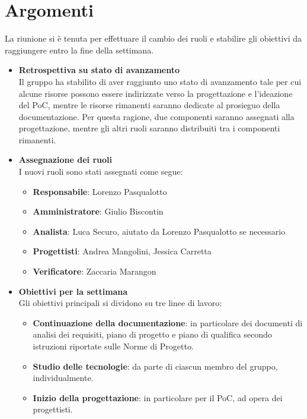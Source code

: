 \section{Argomenti} \label{sec:argomenti}
La riunione si è tenuta per effettuare il cambio dei ruoli e stabilire gli obiettivi da raggiungere entro la fine della settimana.
    \begin{itemize}
        \item \textbf{Retrospettiva su stato di avanzamento} \\
        Il gruppo ha stabilito di aver raggiunto uno stato di avanzamento tale per cui alcune risorse possono essere indirizzate verso la progettazione e l'ideazione del PoC, mentre le risorse rimanenti saranno dedicate al prosieguo della documentazione. Per questa ragione, due componenti saranno assegnati alla progettazione, mentre gli altri ruoli saranno distribuiti tra i componenti rimanenti.
        \item \textbf{Assegnazione dei ruoli} \\
        I nuovi ruoli sono stati assegnati come segue:
        \begin{itemize}
            \item \textbf{Responsabile}: Lorenzo Pasqualotto
            \item \textbf{Amministratore}: Giulio Biscontin
            \item \textbf{Analista}: Luca Securo, aiutato da Lorenzo Pasqualotto se necessario
            \item \textbf{Progettisti}: Andrea Mangolini, Jessica Carretta
            \item \textbf{Verificatore}: Zaccaria Marangon
        \end{itemize}
        \item \textbf{Obiettivi per la settimana}\\
        Gli obiettivi principali si dividono su tre linee di lavoro:
        \begin{itemize}
            \item \textbf{Continuazione della documentazione}: in particolare dei documenti di analisi dei requisiti, piano di progetto e piano di qualifica secondo istruzioni riportate sulle Norme di Progetto.
            \item \textbf{Studio delle tecnologie}: da parte di ciascun membro del gruppo, individualmente.
            \item \textbf{Inizio della progettazione}: in particolare per il PoC, ad opera dei progettisti.

\end{itemize}
\end{itemize}
